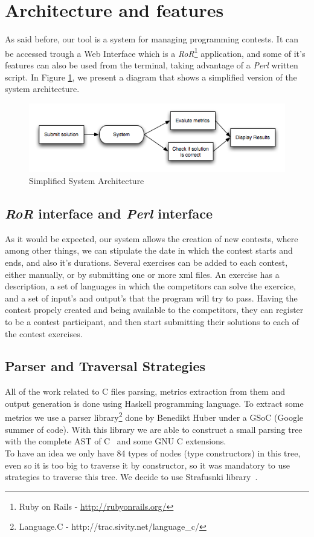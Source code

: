 \section{Architecture and features}
As said before, our tool is a system for managing programming contests. It can be accessed trough a Web Interface which is a \textit{RoR}\footnote{Ruby on Rails - \url{http://rubyonrails.org/}} application, and some of it's features can also be used from the terminal, taking advantage of a \textit{Perl} written script.
In Figure \ref{fig:arq}, we present a diagram that shows a simplified version of the system architecture.

\begin{figure}[htbp]
\includegraphics[scale=0.7]{images/arq}
\caption{Simplified System Architecture}
\label{fig:arq}
\end{figure}

\subsection{\textit{RoR} interface and \textit{Perl} interface}
As it would be expected, our system allows the creation of new contests, where among other things,
we can stipulate the date in which the contest starts and ends, and also it's durations.
Several exercises can be added to each contest, either manually, or by submitting one or more xml files.
An exercise has a description, a set of languages in which the competitors can solve the exercice, and a set of
input's and output's that the program will try to pass.
Having the contest propely created and being available to the competitors, they can register to be a contest participant,
and then start submitting their solutions to each of the contest exercises.  

\subsection{Parser and Traversal Strategies}
All of the work related to C files parsing, metrics extraction from them and output generation is done
using Haskell programming language. To extract some metrics we use a parser
library\footnote{Language.C - http://trac.sivity.net/language\_c/} done by Benedikt Huber under a GSoC (Google summer of code).
With this library we are able to construct a small parsing tree with the complete AST of C~\cite{Kernighan:1988:CPL:576122} and some GNU C extensions.\\
\indent To have an idea we only have 84 types of nodes (type constructors) in this tree, even so it is too big to traverse it by constructor, so
it was mandatory to use strategies to traverse this tree. We decide to use Strafusnki library~\cite{LV03-PADL}.

